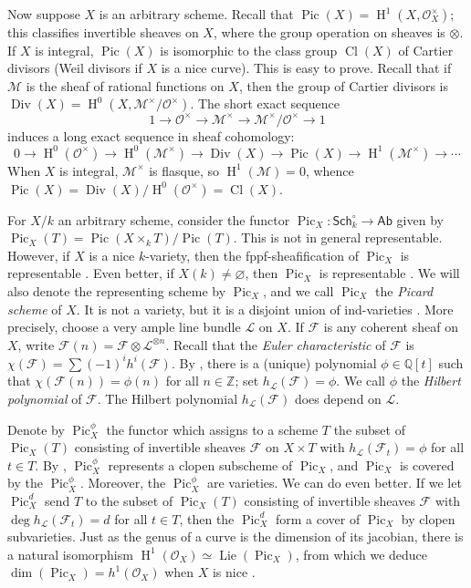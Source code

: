 \documentclass{article}
\DeclareMathOperator{\Div}{Div}
\DeclareMathOperator{\h}{H}
\DeclareMathOperator{\pic}{Pic}
\newcommand{\sO}{\mathscr{O}}
\theoremstyle{definition}
\begin{document}
Now suppose $X$ is an arbitrary scheme. Recall that 
$\pic(X)=\h^1(X,\sO_X^\times)$; this classifies invertible sheaves on 
$X$, where the group operation on sheaves is $\otimes$. If $X$ is integral, 
$\pic(X)$ is isomorphic to the class group $\operatorname{Cl}(X)$ of Cartier 
divisors (Weil divisors if $X$ is a nice curve). This is easy to prove. Recall 
that if $\mathscr{M}$ is the sheaf of rational functions on $X$, then the 
group of Cartier divisors is $\Div(X) = \h^0(X,\mathscr{M}^\times/\sO^\times)$. 
The short exact sequence 
\[
  1 \to \sO^\times \to \mathscr{M}^\times\to \mathscr{M}^\times/\sO^\times \to 1
\]
induces a long exact sequence in sheaf cohomology:
\[
  0 \to \h^0(\sO^\times) \to \h^0(\mathscr{M}^\times) \to \Div(X) \to \pic(X) \to \h^1(\mathscr{M}^\times) \to \cdots
\]
When $X$ is integral, $\mathscr{M}^\times$ is flasque, so 
$\h^1(\mathscr{M}) = 0$, whence 
$\pic(X)=\Div(X)/\h^0(\sO^\times) = \operatorname{Cl}(X)$. 

For $X/k$ an arbitrary scheme, consider the functor 
$\pic_X:\mathsf{Sch}_k^\circ\to\mathsf{Ab}$ given by 
$\pic_X(T) = \pic(X\times_k T)/\pic(T)$. This is not in general 
representable. However, if $X$ is a nice $k$-variety, then the 
fppf-sheafification of $\pic_X$ is representable \cite[4.1.38]{kl05}. Even 
better, if $X(k)\ne\varnothing$, then $\pic_X$ is representable 
\cite[2.5]{kl05}. We will also denote the representing scheme by $\pic_X$, and 
we call $\pic_X$ the \emph{Picard scheme} of $X$. It is not a variety, but it 
is a disjoint union of ind-varieties \cite[4.8]{kl05}. More precisely, choose 
a very ample line bundle $\mathscr{L}$ on $X$. If $\mathscr{F}$ is any coherent 
sheaf on $X$, write 
$\mathscr{F}(n) = \mathscr{F}\otimes\mathscr{L}^{\otimes n}$. Recall that the 
\emph{Euler characteristic} of $\mathscr{F}$ is 
$\chi(\mathscr{F}) = \sum (-1)^i h^i(\mathscr{F})$. By \cite[2.5.3]{gr61}, 
there is a (unique) polynomial $\phi\in \mathbb{Q}[t]$ such that 
$\chi\left(\mathscr{F}(n)\right) = \phi(n)$ for all 
$n\in\mathbb{Z}$; set $h_\mathscr{L}(\mathscr{F}) = \phi$. We call $\phi$ the 
\emph{Hilbert polynomial} of $\mathscr{F}$. The Hilbert polynomial 
$h_\mathscr{L}(\mathscr{F})$ does depend on $\mathscr{L}$.

Denote by 
$\pic_X^\phi$ the functor which assigns to a scheme $T$ the subset of 
$\pic_X(T)$ consisting of invertible sheaves $\mathscr{F}$ on $X\times T$ with 
$h_\mathscr{L}(\mathscr{F}_t) = \phi$ for all $t\in T$. By \cite[6.20]{kl05}, 
$\pic_X^\phi$ represents a clopen subscheme of $\pic_X$, and $\pic_X$ is 
covered by the $\pic_X^\phi$. Moreover, the $\pic_X^\phi$ are varieties. We can 
do even better. If we let $\pic_X^d$ send $T$ to the subset of $\pic_X(T)$ 
consisting of invertible sheaves $\mathscr{F}$ with 
$\deg h_\mathscr{L}(\mathscr{F}_t) = d$ for all $t\in T$, then the 
$\pic_X^d$ form a cover of $\pic_X$ by clopen subvarieties. Just as the genus 
of a curve is the dimension of its jacobian, there is a natural isomorphism 
$\h^1(\mathscr{O}_X) \simeq \operatorname{Lie}(\pic_X)$, from which we deduce 
$\dim(\pic_X) = h^1(\mathscr{O}_X)$ when $X$ is nice \cite[5.11]{kl05}.
\end{document}

